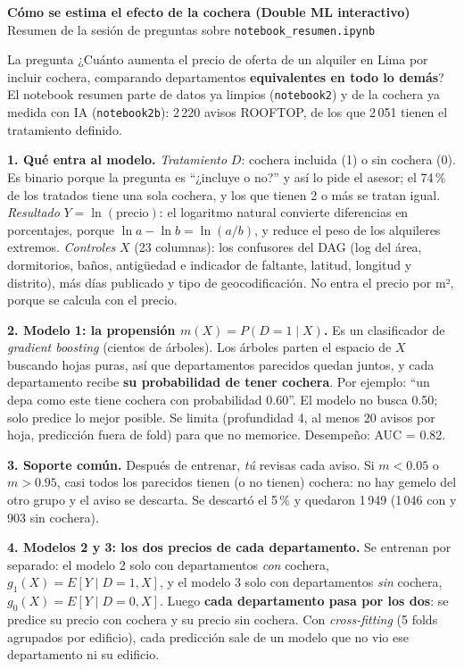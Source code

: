 \documentclass[10pt,a4paper]{article}
\begin{document}
{\Large\bfseries\color{azul} Cómo se estima el efecto de la cochera (Double ML interactivo)}\\[2pt]
{\small Resumen de la sesión de preguntas sobre \texttt{notebook\_resumen.ipynb}}

\begin{caja}{La pregunta}
¿Cuánto aumenta el precio de oferta de un alquiler en Lima por incluir cochera, comparando departamentos \textbf{equivalentes en todo lo demás}? El notebook resumen parte de datos ya limpios (\texttt{notebook2}) y de la cochera ya medida con IA (\texttt{notebook2b}): 2\,220 avisos ROOFTOP, de los que 2\,051 tienen el tratamiento definido.
\end{caja}

\textbf{1. Qué entra al modelo.} \emph{Tratamiento} $D$: cochera incluida (1) o sin cochera (0). Es binario porque la pregunta es ``¿incluye o no?'' y así lo pide el asesor; el 74\,\% de los tratados tiene una sola cochera, y los que tienen 2 o más se tratan igual. \emph{Resultado} $Y=\ln(\text{precio})$: el logaritmo natural convierte diferencias en porcentajes, porque $\ln a-\ln b=\ln(a/b)$, y reduce el peso de los alquileres extremos. \emph{Controles} $X$ (23 columnas): los confusores del DAG (log del área, dormitorios, baños, antigüedad e indicador de faltante, latitud, longitud y distrito), más días publicado y tipo de geocodificación. No entra el precio por m², porque se calcula con el precio.

\textbf{2. Modelo 1: la propensión $m(X)=P(D=1\mid X)$.} Es un clasificador de \textit{gradient boosting} (cientos de árboles). Los árboles parten el espacio de $X$ buscando hojas puras, así que departamentos parecidos quedan juntos, y cada departamento recibe \textbf{su probabilidad de tener cochera}. Por ejemplo: ``un depa como este tiene cochera con probabilidad 0.60''. El modelo no busca 0.50; solo predice lo mejor posible. Se limita (profundidad 4, al menos 20 avisos por hoja, predicción fuera de fold) para que no memorice. Desempeño: AUC = 0.82.

\textbf{3. Soporte común.} Después de entrenar, \emph{tú} revisas cada aviso. Si $m<0.05$ o $m>0.95$, casi todos los parecidos tienen (o no tienen) cochera: no hay gemelo del otro grupo y el aviso se descarta. Se descartó el 5\,\% y quedaron 1\,949 (1\,046 con y 903 sin cochera).

\textbf{4. Modelos 2 y 3: los dos precios de cada departamento.} Se entrenan por separado: el modelo 2 solo con departamentos \emph{con} cochera, $g_1(X)=E[Y\mid D=1,X]$, y el modelo 3 solo con departamentos \emph{sin} cochera, $g_0(X)=E[Y\mid D=0,X]$. Luego \textbf{cada departamento pasa por los dos}: se predice su precio con cochera y su precio sin cochera. Con \textit{cross-fitting} (5 folds agrupados por edificio), cada predicción sale de un modelo que no vio ese departamento ni su edificio.
\end{document}
